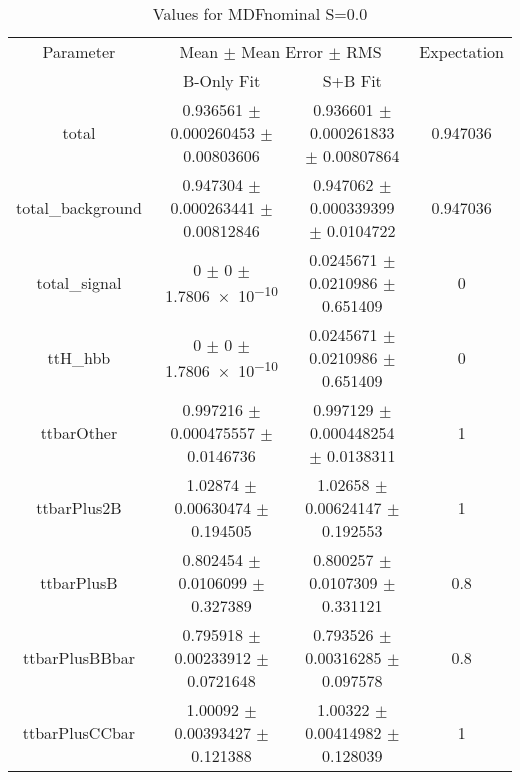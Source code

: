 \begin{table}
\centering
\caption{Values for MDFnominal S=0.0}
\begin{tabular}{cccc}
\toprule
Parameter & \multicolumn{2}{c}{Mean $\pm$ Mean Error $\pm$ RMS} & Expectation\\
 & B-Only Fit & S+B Fit & \\
\midrule
total & \num{0.936561} $\pm$ \num{0.000260453} $\pm$ \num{0.00803606} & \num{0.936601} $\pm$ \num{0.000261833} $\pm$ \num{0.00807864} & \num{0.947036}\\
total\_background & \num{0.947304} $\pm$ \num{0.000263441} $\pm$ \num{0.00812846} & \num{0.947062} $\pm$ \num{0.000339399} $\pm$ \num{0.0104722} & \num{0.947036}\\
total\_signal & \num{0} $\pm$ \num{0} $\pm$ \num{1.7806e-10} & \num{0.0245671} $\pm$ \num{0.0210986} $\pm$ \num{0.651409} & \num{0}\\
ttH\_hbb & \num{0} $\pm$ \num{0} $\pm$ \num{1.7806e-10} & \num{0.0245671} $\pm$ \num{0.0210986} $\pm$ \num{0.651409} & \num{0}\\
ttbarOther & \num{0.997216} $\pm$ \num{0.000475557} $\pm$ \num{0.0146736} & \num{0.997129} $\pm$ \num{0.000448254} $\pm$ \num{0.0138311} & \num{1}\\
ttbarPlus2B & \num{1.02874} $\pm$ \num{0.00630474} $\pm$ \num{0.194505} & \num{1.02658} $\pm$ \num{0.00624147} $\pm$ \num{0.192553} & \num{1}\\
ttbarPlusB & \num{0.802454} $\pm$ \num{0.0106099} $\pm$ \num{0.327389} & \num{0.800257} $\pm$ \num{0.0107309} $\pm$ \num{0.331121} & \num{0.8}\\
ttbarPlusBBbar & \num{0.795918} $\pm$ \num{0.00233912} $\pm$ \num{0.0721648} & \num{0.793526} $\pm$ \num{0.00316285} $\pm$ \num{0.097578} & \num{0.8}\\
ttbarPlusCCbar & \num{1.00092} $\pm$ \num{0.00393427} $\pm$ \num{0.121388} & \num{1.00322} $\pm$ \num{0.00414982} $\pm$ \num{0.128039} & \num{1}\\
\bottomrule
\end{tabular}
\end{table}
